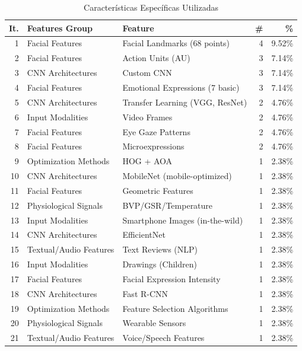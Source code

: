 \documentclass{ieeeaccess}
\begin{document}
	\begin{table}[htbp]
		\caption{Características Específicas Utilizadas}
		\label{tab:caracteristicas}
		\centering
		\footnotesize
		\begin{tabular}{|r|p{50pt}|p{70pt}|r|r|}
			\hline
			\textbf{It.} & \textbf{Features Group} & \textbf{Feature} & \textbf{\#} & \textbf{\%} \\
			\hline
			1 & Facial Features & Facial Landmarks (68 points) & 4 & 9.52\% \\
			2 & Facial Features & Action Units (AU) & 3 & 7.14\% \\
			3 & CNN Architectures & Custom CNN & 3 & 7.14\% \\
			4 & Facial Features & Emotional Expressions (7 basic) & 3 & 7.14\% \\
			5 & CNN Architectures & Transfer Learning (VGG, ResNet) & 2 & 4.76\% \\
			6 & Input Modalities & Video Frames & 2 & 4.76\% \\
			7 & Facial Features & Eye Gaze Patterns & 2 & 4.76\% \\
			8 & Facial Features & Microexpressions & 2 & 4.76\% \\
			9 & Optimization Methods & HOG + AOA & 1 & 2.38\% \\
			10 & CNN Architectures & MobileNet (mobile-optimized) & 1 & 2.38\% \\
			11 & Facial Features & Geometric Features & 1 & 2.38\% \\
			12 & Physiological Signals & BVP/GSR/Temperature & 1 & 2.38\% \\
			13 & Input Modalities & Smartphone Images (in-the-wild) & 1 & 2.38\% \\
			14 & CNN Architectures & EfficientNet & 1 & 2.38\% \\
			15 & Textual/Audio Features & Text Reviews (NLP) & 1 & 2.38\% \\
			16 & Input Modalities & Drawings (Children) & 1 & 2.38\% \\
			17 & Facial Features & Facial Expression Intensity & 1 & 2.38\% \\
			18 & CNN Architectures & Fast R-CNN & 1 & 2.38\% \\
			19 & Optimization Methods & Feature Selection Algorithms & 1 & 2.38\% \\
			20 & Physiological Signals & Wearable Sensors & 1 & 2.38\% \\
			21 & Textual/Audio Features & Voice/Speech Features & 1 & 2.38\% \\

\end{tabular}
\end{table}
\end{document}
